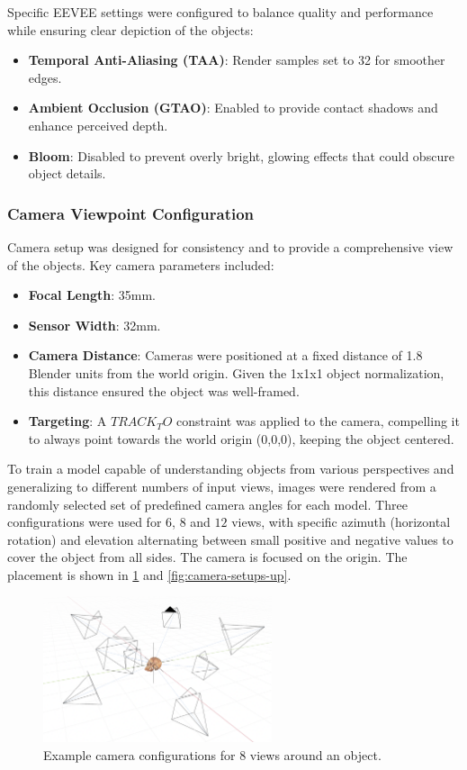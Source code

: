 Specific EEVEE settings were configured to balance quality and performance while ensuring clear depiction of the objects:
\begin{itemize}
  \item \textbf{Temporal Anti-Aliasing (TAA)}: Render samples set to 32 for smoother edges.
  \item \textbf{Ambient Occlusion (GTAO)}: Enabled to provide contact shadows and enhance perceived depth.
  \item \textbf{Bloom}: Disabled to prevent overly bright, glowing effects that could obscure object details.
\end{itemize}

\subsubsection{Camera Viewpoint Configuration}\label{sssec:camera-config}
Camera setup was designed for consistency and to provide a comprehensive view of the objects.
Key camera parameters included:
\begin{itemize}
  \item \textbf{Focal Length}: 35mm.
  \item \textbf{Sensor Width}: 32mm.
  \item \textbf{Camera Distance}: Cameras were positioned at a fixed distance of 1.8 Blender units from the world origin. Given the 1x1x1 object normalization, this distance ensured the object was well-framed.
  \item \textbf{Targeting}: A $TRACK_TO$ constraint was applied to the camera, compelling it to always point towards the world origin (0,0,0), keeping the object centered.
\end{itemize}

To train a model capable of understanding objects from various perspectives and generalizing to different numbers of input views, images were rendered from a randomly selected set of predefined camera angles for each model. Three configurations were used for $6$, $8$ and $12$ views, with specific azimuth (horizontal rotation) and elevation alternating between small positive and negative values to cover the object from all sides. The camera is focused on the origin. The placement is shown in \ref{fig:camera-setups} and \ref{fig:camera-setups-up}.

\begin{figure}[h]
  \centering
  \includegraphics[width=0.6\textwidth]{images/data/rendering-ortho.png}
  \caption{Example camera configurations for 8 views around an object.}
  \label{fig:camera-setups}
\end{figure}


